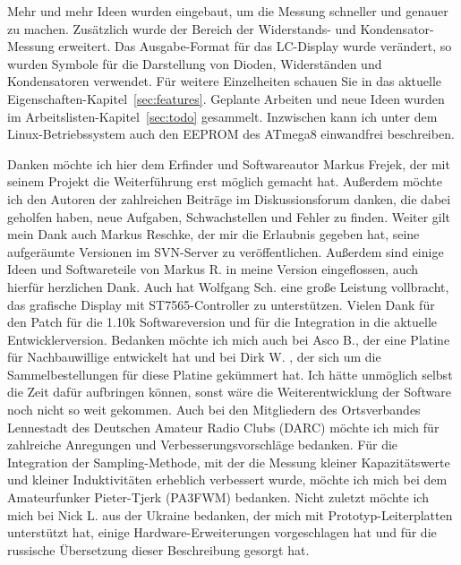 Mehr und mehr Ideen wurden eingebaut, um die Messung schneller und genauer zu machen.
Zusätzlich wurde der Bereich der Widerstands- und Kondensator-Messung erweitert.
Das Ausgabe-Format für das LC-Display wurde verändert, so wurden Symbole für die Darstellung von
Dioden, Widerständen und Kondensatoren verwendet.
Für weitere Einzelheiten schauen Sie in das aktuelle Eigenschaften-Kapitel~\ref{sec:features}.
Geplante Arbeiten und neue Ideen wurden im Arbeitslisten-Kapitel~\ref{sec:todo} gesammelt.
Inzwischen kann ich unter dem Linux-Betriebssystem auch den EEPROM des ATmega8 einwandfrei beschreiben.

Danken möchte ich hier dem Erfinder und Softwareautor Markus Frejek, der mit seinem Projekt die Weiterführung erst
möglich gemacht hat.
Außerdem möchte ich den Autoren der zahlreichen Beiträge im Diskussionsforum danken, die dabei geholfen haben, neue Aufgaben, Schwachstellen und
Fehler zu finden. 
Weiter gilt mein Dank auch Markus Reschke, der mir die Erlaubnis gegeben hat, seine aufgeräumte Versionen im
SVN-Server zu veröffentlichen. Außerdem sind einige Ideen und Softwareteile von Markus R. in meine Version eingeflossen,
auch hierfür herzlichen Dank.
Auch hat Wolfgang Sch. eine große Leistung vollbracht, das grafische Display mit ST7565-Controller zu unterstützen.
Vielen Dank für den Patch für die 1.10k Softwareversion und für die Integration in die aktuelle Entwicklerversion.
Bedanken möchte ich mich auch bei Asco B., der eine Platine für Nachbauwillige entwickelt hat und bei Dirk W. , der sich
um die Sammelbestellungen für diese Platine gekümmert hat. Ich hätte unmöglich selbst die Zeit dafür aufbringen können, sonst
wäre die Weiterentwicklung der Software noch nicht so weit gekommen.
Auch bei den Mitgliedern des Ortsverbandes Lennestadt des Deutschen Amateur Radio Clubs (DARC) möchte ich mich für zahlreiche
Anregungen und Verbesserungsvorschläge bedanken.
Für die Integration der Sampling-Methode, mit der die Messung kleiner Kapazitätswerte und kleiner Induktivitäten
erheblich verbessert wurde, möchte ich mich bei dem Amateurfunker Pieter-Tjerk (PA3FWM) bedanken.
Nicht zuletzt möchte ich mich bei Nick L. aus der Ukraine bedanken, der mich mit Prototyp-Leiterplatten unterstützt hat,
einige Hardware-Erweiterungen vorgeschlagen hat und für die russische Übersetzung dieser Beschreibung gesorgt hat.

